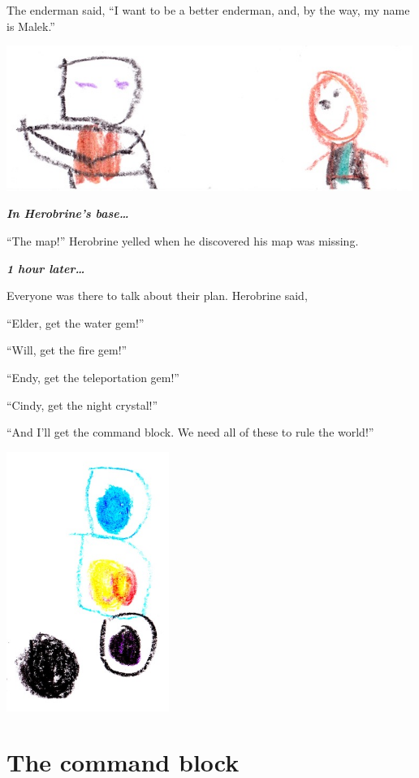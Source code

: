\documentclass[oneside]{book}
\begin{document}
The enderman said, ``I want to be a better enderman, and, by the way, my
name is Malek.''

\includegraphics[width=5.20833in]{img/malek-beckett.jpg}

\textbf{\emph{In Herobrine's base\ldots{}}}

``The map!'' Herobrine yelled when he discovered his map was missing.

\textbf{\emph{1 hour later\ldots{}}}

Everyone was there to talk about their plan. Herobrine said,

``Elder, get the water gem!''

``Will, get the fire gem!''

``Endy, get the teleportation gem!''

``Cindy, get the night crystal!''

``And I'll get the command block. We need all of these to rule the
world!''

\includegraphics[width=2.08333in]{img/crystals.jpg}

\chapter{The command block}\label{the-command-block}
\end{document}
